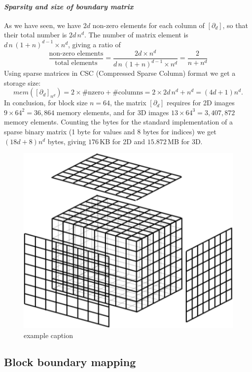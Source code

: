 \documentclass[11pt, oneside]{amsart}   	%
\begin{document}
\paragraph{\emph{Sparsity and size of boundary matrix }\label{sec:bbbb}}

As we have seen, we have $2d$ non-zero elements for each column of $[\partial_d]$, so that their total number is $2d\,n^d$. The number of matrix element is $d\,n\,(1+n)^{d-1} \times n^d$, giving a ratio of 
\[
\frac{\mbox{non-zero\ elements}}{\mbox{total\ elements}} = 
\frac{2d\times n^d}{d\,n\,(1+n)^{d-1} \times n^d} =
\frac{2}{n+n^d}
\]
Using sparse matrices in CSC (Compressed Sparse Column) format we get a storage size:
\[
mem([\partial_d]_{n^d}) = 2\times \#\mbox{nzero} + \#\mbox{columns} = 2\times 2d\,n^d + n^d = (4d+1)n^d.
\]
In conclusion, for block size $n=64$, the matrix $[\partial_d]$ requires for 2D images $9\times 64^2=36,864$ memory elements, and for 3D images $13\times 64^3=3,407,872$ memory elements. Counting the bytes for the standard implementation of a sparse binary matrix (1 byte for values and 8 bytes for indices) we get $(18d+8)n^d$ bytes, giving $176$\,KB for 2D and $15.872$\,MB for 3D.


\begin{figure}[htbp] %
   \centering
   \includegraphics[width=0.4\linewidth]{figs/grid.pdf} 
   \caption{example caption}
   \label{fig:example}
\end{figure}



\subsection{Block boundary mapping}\label{sec:bbbb}
\end{document}
